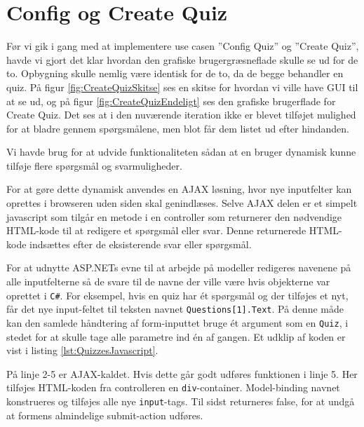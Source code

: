 \section{Config og Create Quiz}
Før vi gik i gang med at implementere use casen ''Config Quiz'' og ''Create Quiz'', havde vi gjort det klar hvordan den grafiske brugergræsneflade skulle se ud for de to. Opbygning skulle nemlig være identisk for de to, da de begge behandler en quiz. På figur \ref{fig:CreateQuizSkitse} ses en skitse for hvordan vi ville have GUI til at se ud, og på figur \ref{fig:CreateQuizEndeligt} ses den grafiske brugerflade for Create Quiz. Det ses at i den nuværende iteration ikke er blevet tilføjet mulighed for at bladre gennem spørgsmålene, men blot får dem listet ud efter hindanden.

\begin{minipage}{0.45\textwidth}
\end{minipage}
\begin{minipage}{0.55\textwidth}
\end{minipage}

\vspace{6 mm}

Vi havde brug for at udvide funktionaliteten sådan at en bruger dynamisk kunne tilføje flere spørgsmål og svarmuligheder.

For at gøre dette dynamisk anvendes en AJAX løsning, hvor nye inputfelter kan oprettes i browseren uden siden skal genindlæses.
Selve AJAX delen er et simpelt javascript som tilgår en metode i en controller som returnerer den nødvendige HTML-kode til at redigere et spørgsmål eller svar. Denne returnerede HTML-kode indsættes efter de eksisterende svar eller spørgsmål.

For at udnytte ASP.NETs evne til at arbejde på modeller redigeres navenene på alle inputfelterne så de svare til de navne der ville være hvis objekterne var oprettet i \verb+C#+.
For eksempel, hvis en quiz har ét spørgsmål og der tilføjes et nyt, får det nye input-feltet til teksten navnet \verb+Questions[1].Text+.
På denne måde kan den samlede håndtering af form-inputtet bruge ét argument som en \verb+Quiz+, i stedet for at skulle tage alle parametre ind én af gangen. Et udklip af koden er vist i listing \ref{lst:QuizzesJavascript}.

På linje 2-5 er AJAX-kaldet. Hvis dette går godt udføres funktionen i linje 5. Her tilføjes HTML-koden fra controlleren en \verb+div+-container. Model-binding navnet konstrueres og tilføjes alle nye \verb+input+-tags. Til sidst returneres false, for at undgå at formens almindelige submit-action udføres.

